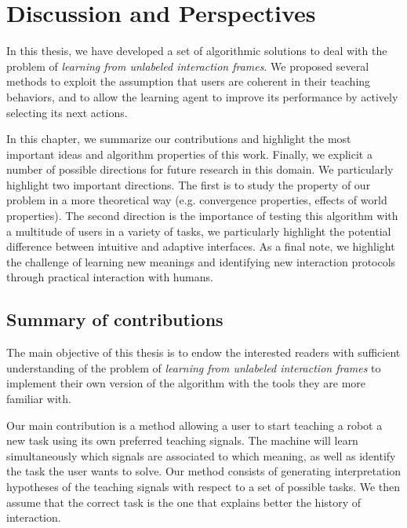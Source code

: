 
\chapter{Discussion and Perspectives}
\label{chapter:conclusion}
\minitoc

In this thesis, we have developed a set of algorithmic solutions to deal with the problem of \emph{learning from unlabeled interaction frames}. We proposed several methods to exploit the assumption that users are coherent in their teaching behaviors, and to allow the learning agent to improve its performance by actively selecting its next actions.

In this chapter, we summarize our contributions and highlight the most important ideas and algorithm properties of this work. Finally, we explicit a number of possible directions for future research in this domain. We particularly highlight two important directions. The first is to study the property of our problem in a more theoretical way (e.g. convergence properties, effects of world properties). The second direction is the importance of testing this algorithm with a multitude of users in a variety of tasks, we particularly highlight the potential difference between intuitive and adaptive interfaces. As a final note, we highlight the challenge of learning new meanings and identifying new interaction protocols through practical interaction with humans.

\section{Summary of contributions}

The main objective of this thesis is to endow the interested readers with sufficient understanding of the problem of \emph{learning from unlabeled interaction frames} to implement their own version of the algorithm with the tools they are more familiar with.

Our main contribution is a method allowing a user to start teaching a robot a new task using its own preferred teaching signals. The machine will learn simultaneously which signals are associated to which meaning, as well as identify the task the user wants to solve. Our method consists of generating interpretation hypotheses of the teaching signals with respect to a set of possible tasks. We then assume that the correct task is the one that explains better the history of interaction.

